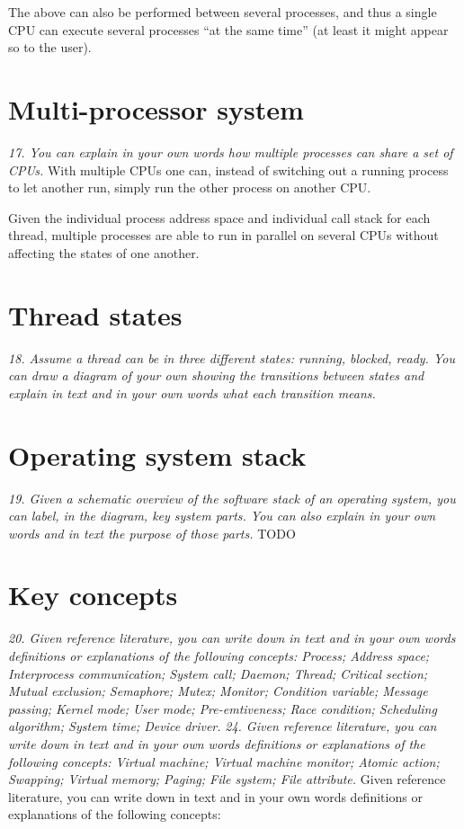 \documentclass{article}
\begin{document}
The above can also be performed between several processes, and thus a single CPU can execute several processes ``at the same time'' (at least it might appear so to the user).


\section{Multi-processor system}
\emph{17. You can explain in your own words how multiple processes can share a set of CPUs.}
With multiple CPUs one can, instead of switching out a running process to let another run, simply run the other process on another CPU.

Given the individual process address space and individual call stack for each thread, multiple processes are able to run in parallel on several CPUs without affecting the states of one another.


\section{Thread states}
\emph{18. Assume a thread can be in three different states: running, blocked, ready. You can draw a diagram of your own showing the transitions between states and explain in text and in your own words what each transition means.}



\section{Operating system stack}
\emph{19. Given a schematic overview of the software stack of an operating system, you can label, in the diagram, key system parts. You can also explain in your own words and in text the purpose of those parts.}
TODO


\section{Key concepts}
\emph{20. Given reference literature, you can write down in text and in your own words definitions or explanations of the following concepts: Process; Address space; Interprocess communication; System call; Daemon; Thread; Critical section; Mutual exclusion; Semaphore; Mutex; Monitor; Condition variable; Message passing; Kernel mode; User mode; Pre-emtiveness; Race condition; Scheduling algorithm; System time; Device driver.}
\emph{24. Given reference literature, you can write down in text and in your own words definitions or explanations of the following concepts: Virtual machine; Virtual machine monitor; Atomic action; Swapping; Virtual memory; Paging; File system; File attribute.}
Given reference literature, you can write down in text and in your own words definitions or explanations of the following concepts:
\end{document}
